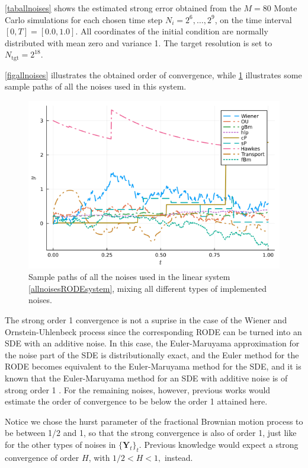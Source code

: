 \documentclass[reqno,12pt]{amsart}
\theoremstyle{plain} %
\theoremstyle{definition} %
\begin{document}
\cref{taballnoises} shows the estimated strong error obtained from the $M = 80$ Monte Carlo simulations for each chosen time step $N_i = 2^6, \ldots, 2^9$,  on the time interval $[0, T] = [0.0, 1.0]$. All coordinates of the initial condition are normally distributed with mean zero and variance 1. The target resolution is set to $N_{\textrm{tgt}} = 2^{18}$.

\cref{figallnoises} illustrates the obtained order of convergence, while \cref{figsamplepathsallnoises} illustrates some sample paths of all the noises used in this system.

\begin{figure}[htb]
    \includegraphics[scale=0.6]{img/noisepath_allnoises.png}
    \caption{Sample paths of all the noises used in the linear system \eqref{allnoisesRODEsystem}, mixing all different types of implemented noises.}
    \label{figsamplepathsallnoises}
\end{figure}

The strong order 1 convergence is not a suprise in the case of the Wiener and Ornstein-Uhlenbeck process since the corresponding RODE can be turned into an SDE with an additive noise. In this case, the Euler-Maruyama approximation for the noise part of the SDE is distributionally exact, and the Euler method for the RODE becomes equivalent to the Euler-Maruyama method for the SDE, and it is known that the Euler-Maruyama method for an SDE with additive noise is of strong order 1 \cite{HighamKloeden2021}. For the remaining noises, however, previous works would estimate the order of convergence to be below the order 1 attained here.

Notice we chose the hurst parameter of the fractional Brownian motion process to be between 1/2 and 1, so that the strong convergence is also of order 1, just like for the other types of noises in $\{\mathbf{Y}_t\}_t$. Previous knowledge would expect a strong convergence of order $H$, with $1/2 < H < 1,$ instead.
\end{document}

